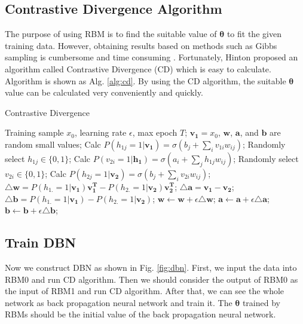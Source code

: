 \documentclass{bioinfo}
\begin{document}
\subsection{Contrastive Divergence Algorithm}
The purpose of using RBM is to find the suitable value of $\boldsymbol{\theta}$ to fit the given training data. However, obtaining results based on methods such as Gibbs sampling is cumbersome and time consuming \cite{zhangchunxia}. Fortunately, Hinton proposed an algorithm called Contrastive Divergence (CD) \cite{Hinton2002Training} which is easy to calculate. Algorithm is shown as Alg. \ref{alg:cd}. By using the CD algorithm, the suitable $\boldsymbol{\theta}$ value can be calculated very conveniently and quickly.
\begin{algorithm}
	\caption{Contrastive Divergence}
	\label{alg:cd}
	\begin{algorithmic}[1]
		\STATE Training sample $x_0$, learning rate $\epsilon$, max epoch $T$;
		\STATE $\mathbf{v_1}=x_0$, $\mathbf{w}$, $\mathbf{a}$, and $\mathbf{b}$ are random small values;
			\STATE Calc $P\left(h_{1j}=1 | \mathbf{v_1} \right)=\sigma\left(b_{j}+\sum_{i} v_{1i} w_{i j}\right)$;
			\STATE Randomly select $h_{1j}\in\{0,1\}$;
		\ENDFOR
			\STATE Calc $P\left(v_{2i}=1 | \mathbf{h_1} \right)=\sigma\left(a_{i}+\sum_{j} h_{1j} w_{i j}\right)$;
			\STATE Randomly select $v_{2i}\in\{0,1\}$;
		\ENDFOR
			\STATE Calc $P\left(h_{2j}=1 | \mathbf{v_2} \right)=\sigma\left(b_{j}+\sum_{i} v_{2i} w_{i j}\right)$;
		\ENDFOR
		\STATE $\mathbf{\triangle w}=P(h_{1.}=1|\mathbf{v_1})\mathbf{v_1^T}-P(h_{2.}=1|\mathbf{v_2})\mathbf{v_2^T}$;
		\STATE $\mathbf{\triangle a}=\mathbf{v_1}-\mathbf{v_2}$;
		\STATE $\mathbf{\triangle b}=P(h_{1.}=1|\mathbf{v_1})-P(h_{2.}=1|\mathbf{v_2})$;
		\STATE $\mathbf{w}\leftarrow \mathbf{w}+\epsilon\triangle\mathbf{w}$;
		\STATE $\mathbf{a}\leftarrow \mathbf{a}+\epsilon\triangle\mathbf{a}$;
		\STATE $\mathbf{b}\leftarrow \mathbf{b}+\epsilon\triangle\mathbf{b}$;
		\ENDFOR
	\end{algorithmic} 
\end{algorithm} 
\subsection{Train DBN}
Now we construct DBN as shown in Fig. \ref{fig:dbn}. First, we input the data into RBM0 and run CD algorithm. Then we should consider the output of RBM0 as the input of RBM1 and run CD algorithm. After that, we can see the whole network as back propagation neural network and train it. The $\boldsymbol{\theta}$ trained by RBMs should be the initial value of the back propagation neural network.
\end{document}

